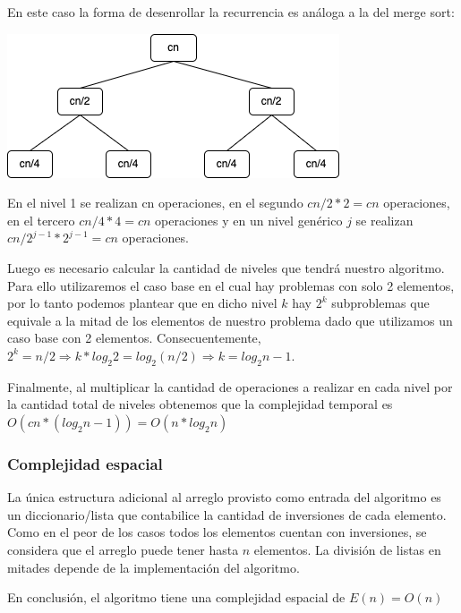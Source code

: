 \documentclass[titlepage,a4paper]{article}
\begin{document}
En este caso la forma de desenrollar la recurrencia es análoga a la del merge sort:

\begin{center}
\includegraphics[width=.9\linewidth]{assets/desarrollo_concurrencia.png}
\end{center}

En el nivel 1 se realizan cn operaciones, en el segundo \(cn/2 * 2 = cn\) operaciones, en el tercero \(cn/4 * 4 = cn\) operaciones y en un nivel genérico \(j\) se realizan \(cn/2^{j-1} * 2^{j-1} = cn\) operaciones.

Luego es necesario calcular la cantidad de niveles que tendrá nuestro algoritmo. Para ello utilizaremos el caso base en el cual hay problemas con solo 2 elementos, por lo tanto podemos plantear que en dicho nivel \(k\) hay \(2^k\) subproblemas que equivale a la mitad de los elementos de nuestro problema dado que utilizamos un caso base con 2 elementos. Consecuentemente, \(2^k = n/2 \Rightarrow k * log_2 2 = log_2 (n/2) \Rightarrow k = log_2 n - 1\).

Finalmente, al multiplicar la cantidad de operaciones a realizar en cada nivel por la cantidad total de niveles obtenemos que la complejidad temporal es \(O(cn * (log_2 n - 1)) = O(n * log_2 n)\)

\subsubsection{Complejidad espacial}
\label{sec:org5d8acc7}

La única estructura adicional al arreglo provisto como entrada del algoritmo es un diccionario/lista que contabilice la cantidad de inversiones de cada elemento. Como en el peor de los casos todos los elementos cuentan con inversiones, se considera que el arreglo puede tener hasta \(n\) elementos. La división de listas en mitades depende de la implementación del algoritmo.

En conclusión, el algoritmo tiene una complejidad espacial de \(E(n) = O(n)\)
\end{document}
